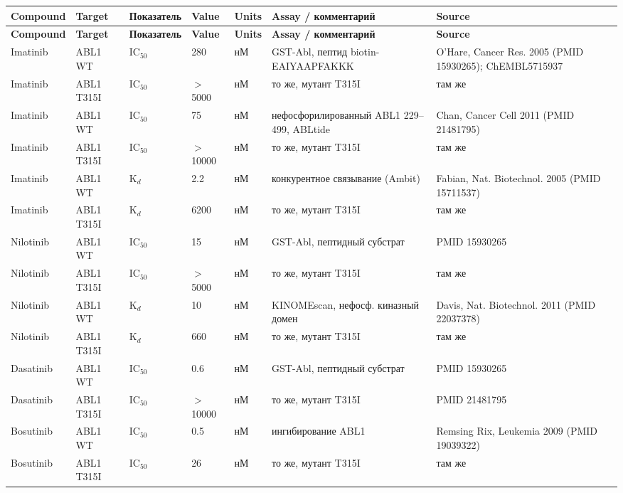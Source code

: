 \documentclass[11pt,a4paper]{article}
\begin{document}
\begin{center}
\scriptsize
\begin{longtable}{|L{1.6cm}|L{1.5cm}|L{1.1cm}|L{1.2cm}|L{0.7cm}|L{2.9cm}|L{3.6cm}|}
\hline
\textbf{Compound} & \textbf{Target} & \textbf{Показа\-тель} & \textbf{Value} &
\textbf{Units} & \textbf{Assay / комментарий} & \textbf{Source} \\
\hline
\endfirsthead
\hline
\textbf{Compound} & \textbf{Target} & \textbf{Показа\-тель} & \textbf{Value} &
\textbf{Units} & \textbf{Assay / комментарий} & \textbf{Source} \\
\hline
\endhead
Imatinib & ABL1 WT & IC$_{50}$ & 280 & нМ & GST-Abl, пептид biotin-EAIYAAPFAKKK &
O'Hare, Cancer Res. 2005 (PMID 15930265); ChEMBL5715937 \\
\hline
Imatinib & ABL1 T315I & IC$_{50}$ & $>$5000 & нМ & то же, мутант T315I & там же \\
\hline
Imatinib & ABL1 WT & IC$_{50}$ & 75 & нМ & нефосфори\-лированный ABL1 229--499, ABLtide &
Chan, Cancer Cell 2011 (PMID 21481795) \\
\hline
Imatinib & ABL1 T315I & IC$_{50}$ & $>$10000 & нМ & то же, мутант T315I & там же \\
\hline
Imatinib & ABL1 WT & K$_d$ & 2.2 & нМ & конкурентное связывание (Ambit) &
Fabian, Nat. Biotechnol. 2005 (PMID 15711537) \\
\hline
Imatinib & ABL1 T315I & K$_d$ & 6200 & нМ & то же, мутант T315I & там же \\
\hline
Nilotinib & ABL1 WT & IC$_{50}$ & 15 & нМ & GST-Abl, пептидный субстрат & PMID 15930265 \\
\hline
Nilotinib & ABL1 T315I & IC$_{50}$ & $>$5000 & нМ & то же, мутант T315I & там же \\
\hline
Nilotinib & ABL1 WT & K$_d$ & 10 & нМ & KINOMEscan, нефосф. киназный домен &
Davis, Nat. Biotechnol. 2011 (PMID 22037378) \\
\hline
Nilotinib & ABL1 T315I & K$_d$ & 660 & нМ & то же, мутант T315I & там же \\
\hline
Dasatinib & ABL1 WT & IC$_{50}$ & 0.6 & нМ & GST-Abl, пептидный субстрат & PMID 15930265 \\
\hline
Dasatinib & ABL1 T315I & IC$_{50}$ & $>$10000 & нМ & то же, мутант T315I & PMID 21481795 \\
\hline
Bosutinib & ABL1 WT & IC$_{50}$ & 0.5 & нМ & ингибирование ABL1 &
Remsing Rix, Leukemia 2009 (PMID 19039322) \\
\hline
Bosutinib & ABL1 T315I & IC$_{50}$ & 26 & нМ & то же, мутант T315I & там же \\

\end{longtable}
\end{center}
\end{document}
